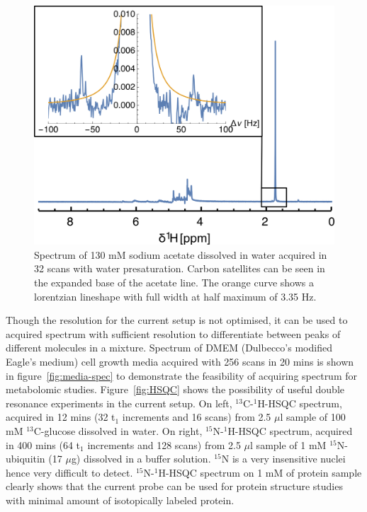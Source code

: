 \documentclass[preprint,12pt]{article}
\begin{document}
\begin{figure}
\centering
\includegraphics[width=\linewidth,keepaspectratio=true]{./figures/lineshape.png} 
\caption{Spectrum of 130 mM sodium acetate dissolved in water acquired in 32 scans with water presaturation. Carbon satellites can be seen in the expanded base of the acetate line. The orange curve shows a lorentzian lineshape with full width at half maximum of 3.35 Hz.}
\label{fig:lineshape} 
\end{figure}
Though the resolution for the current setup is not optimised, it can be used to acquired spectrum with sufficient resolution to differentiate between peaks of different molecules in a mixture. Spectrum of DMEM (Dulbecco's modified Eagle's medium) cell growth media acquired with 256 scans in 20 mins is shown in figure~\ref{fig:media-spec} to demonstrate the feasibility of acquiring spectrum for metabolomic studies. Figure~\ref{fig:HSQC} shows the possibility of useful double resonance experiments in the current setup. On left, $^{13}$C-$^{1}$H-HSQC spectrum, acquired in 12 mins (32 t$_1$ increments and 16 scans) from 2.5 $\mu$l sample of 100 mM $^{13}$C-glucose dissolved in water. On right, $^{15}$N-$^{1}$H-HSQC spectrum, acquired in 400 mins (64 t$_1$ increments and 128 scans) from 2.5 $\mu$l sample of 1 mM $^{15}$N-ubiquitin (17 $\mu$g) dissolved in a buffer solution. $^{15}$N is a very insensitive nuclei hence very difficult to detect. $^{15}$N-$^{1}$H-HSQC spectrum on 1 mM of protein sample clearly shows that the current probe can be used for protein structure studies with minimal amount of isotopically labeled protein.\par
\end{document}

